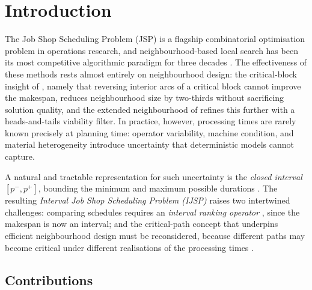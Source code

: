 \documentclass[preprint,12pt]{elsarticle}
\begin{document}
\section{Introduction}
\label{sec:intro}

The Job Shop Scheduling Problem (JSP) is a flagship combinatorial optimisation problem in operations research, and neighbourhood-based local search has been its most competitive algorithmic paradigm for three decades \cite{vanLaarhoven1992,Nowicki1996,Nowicki2005}. The effectiveness of these methods rests almost entirely on neighbourhood design: the critical-block insight of \cite{Nowicki1996}, namely that reversing interior arcs of a critical block cannot improve the makespan, reduces neighbourhood size by two-thirds without sacrificing solution quality, and the extended neighbourhood of \cite{Nowicki2005} refines this further with a heads-and-tails viability filter. In practice, however, processing times are rarely known precisely at planning time: operator variability, machine condition, and material heterogeneity introduce uncertainty that deterministic models cannot capture.

A natural and tractable representation for such uncertainty is the \emph{closed interval} $[p^-, p^+]$, bounding the minimum and maximum possible durations \cite{Moore2009,Lei2012c}. The resulting \emph{Interval Job Shop Scheduling Problem (IJSP)} raises two intertwined challenges: comparing schedules requires an \emph{interval ranking operator} \cite{Bustince2013,Karmakar2012}, since the makespan is now an interval; and the critical-path concept that underpins efficient neighbourhood design must be reconsidered, because different paths may become critical under different realisations of the processing times \cite{Dubois2003,Artigues2015,GonzalezRodriguez2008}.

\subsection{Contributions}
\label{sec:contributions}
\end{document}
